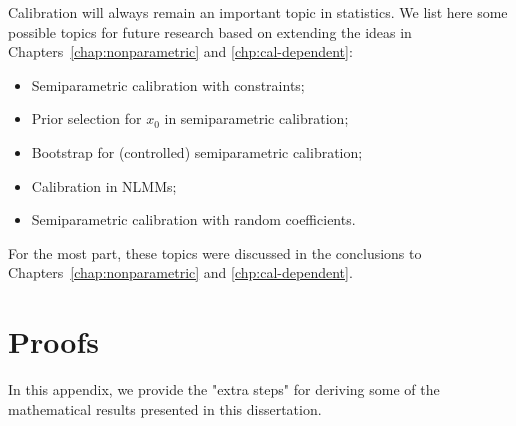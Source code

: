 \documentclass[cmfont,usenames,dvipsnames,leqno]{afit-etd}\usepackage[]{graphicx}\usepackage[]{color}
\begin{document}
Calibration will always remain an important topic in statistics. We list here some possible topics for future research based on extending the ideas in Chapters~\ref{chap:nonparametric} and \ref{chp:cal-dependent}:
\begin{itemize}
  \item Semiparametric calibration with constraints;
  \item Prior selection for $x_0$ in semiparametric calibration;
  \item Bootstrap for (controlled) semiparametric calibration;
  \item Calibration in NLMMs;
  \item Semiparametric calibration with random coefficients.
\end{itemize}
For the most part, these topics were discussed in the conclusions to Chapters~\ref{chap:nonparametric} and \ref{chp:cal-dependent}.




\appendix  	%

\chapter{Proofs}
\label{app:proofs}
In this appendix, we provide the "extra steps" for deriving some of the mathematical results presented in this dissertation.
\end{document}
